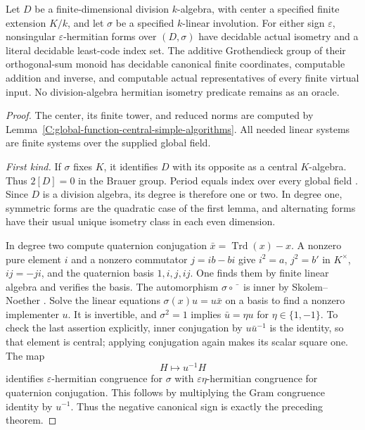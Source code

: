 \begin{theorem}
\label{C:global-function-hermitian-isometry}
Let $D$ be a finite-dimensional division $k$-algebra,
with center a specified finite extension $K/k$,
and let $\sigma$ be a specified $k$-linear involution.
For either sign $\varepsilon$, nonsingular
$\varepsilon$-hermitian forms over $(D,\sigma)$
have decidable actual isometry and a literal
decidable least-code index set.
The additive Grothendieck group of their
orthogonal-sum monoid has decidable canonical
finite coordinates, computable addition and
inverse, and computable actual representatives
of every finite virtual input.
No division-algebra hermitian isometry
predicate remains as an oracle.
\end{theorem}
\begin{proof}
The center, its finite tower, and reduced norms
are computed by
Lemma~\ref{C:global-function-central-simple-algorithms}.
All needed linear systems are finite systems
over the supplied global field.

\emph{First kind.}
If $\sigma$ fixes $K$, it identifies $D$
with its opposite as a central $K$-algebra.
Thus $2[D]=0$ in the Brauer group.
Period equals index over every global field
\cite[Theorem 1.5.36(iv), pp.\ 25--26]
 {C-PoonenRationalPoints2017}.
Since $D$ is a division algebra, its degree
is therefore one or two.
In degree one, symmetric forms are the
quadratic case of the first lemma, and
alternating forms have their usual unique
isometry class in each even dimension.

In degree two compute quaternion conjugation
$\bar x=\operatorname{Trd}(x)-x$.
A nonzero pure element $i$ and a nonzero
commutator $j=ib-bi$ give
$i^2=a$, $j^2=b'$ in $K^\times$,
$ij=-ji$, and the quaternion basis
$1,i,j,ij$.
One finds them by finite linear algebra
and verifies the basis.
The automorphism $\sigma\circ\bar{\phantom{x}}$
is inner by Skolem--Noether
\cite[Lemma 11.6.2, Tag 074R]
 {C-StacksGlobalFormSkolem}.
Solve the linear equations
$\sigma(x)u=u\bar x$ on a basis
to find a nonzero implementer $u$.
It is invertible, and $\sigma^2=1$
implies $\bar u=\eta u$ for
$\eta\in\{1,-1\}$.
To check the last assertion explicitly,
inner conjugation by $u\bar u^{-1}$
is the identity, so that element
is central; applying conjugation
again makes its scalar square one.
The map
\[
                 H\longmapsto u^{-1}H
                                                               \tag{C.3.GH6}
\]
identifies $\varepsilon$-hermitian
congruence for $\sigma$ with
$\varepsilon\eta$-hermitian
congruence for quaternion conjugation.
This follows by multiplying the
Gram congruence identity by $u^{-1}$.
Thus the negative canonical sign
is exactly the preceding theorem.


\end{proof}
